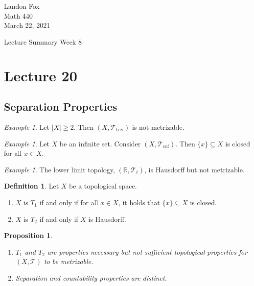 \documentclass[ 12pt ]{article}
\newcounter{lecture_num}
\theoremstyle{plain}
\theoremstyle{plain}
\newtheorem{proposition}[theorem]{Proposition}
\theoremstyle{definition}
\newtheorem{definition}[theorem]{Definition}
\theoremstyle{remark}
\newtheorem{example}[theorem]{Example}
\begin{document}
\noindent Landon Fox \\
\noindent Math 440 \\
\noindent March 22, 2021

\begin{center}
	\Large Lecture Summary Week 8
\end{center}

\setcounter{lecture_num}{20}
\setcounter{theorem}{0}
\section*{Lecture 20}

\subsection*{Separation Properties}

\begin{example}
	Let $|X| \geq 2$. Then $(X, \mathcal{T}_\mathrm{triv})$ is not metrizable.
\end{example}

\begin{example}
	Let $X$ be an infinite set. Consider $(X, \mathcal{T}_\mathrm{cof})$. Then $\{ x \} \subseteq X$ is closed for all $x \in X$.
\end{example}

\begin{example}
	The lower limit topology, $( \mathbb{R}, \mathcal{T}_\ell)$, is Hausdorff but not metrizable.
\end{example}

\begin{definition}
	Let $X$ be a topological space.
	\begin{enumerate}
		\item $X$ is $T_1$ if and only if for all $x \in X$, it holds that $\{ x \} \subseteq X$ is closed.
		\item $X$ is $T_2$ if and only if $X$ is Hausdorff.
	\end{enumerate}
\end{definition}

\begin{proposition} $ $
	\begin{enumerate}
		\item $T_1$ and $T_2$ are properties necessary but not sufficient topological properties for $(X, \mathcal{T})$ to be metrizable.
		\item Separation and countability properties are distinct.
	\end{enumerate}
\end{proposition}
\end{document}
